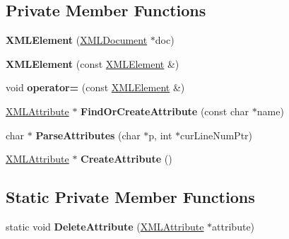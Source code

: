 \subsection*{Private Member Functions}
\begin{DoxyCompactItemize}
\item 
{\bfseries X\+M\+L\+Element} (\hyperlink{classtinyxml2_1_1XMLDocument}{X\+M\+L\+Document} $\ast$doc)\hypertarget{classtinyxml2_1_1XMLElement_a52484940e20f3734e6edc5e5c3af2dbc}{}\label{classtinyxml2_1_1XMLElement_a52484940e20f3734e6edc5e5c3af2dbc}

\item 
{\bfseries X\+M\+L\+Element} (const \hyperlink{classtinyxml2_1_1XMLElement}{X\+M\+L\+Element} \&)\hypertarget{classtinyxml2_1_1XMLElement_a1aa8ab977a1799bf118efb158248351b}{}\label{classtinyxml2_1_1XMLElement_a1aa8ab977a1799bf118efb158248351b}

\item 
void {\bfseries operator=} (const \hyperlink{classtinyxml2_1_1XMLElement}{X\+M\+L\+Element} \&)\hypertarget{classtinyxml2_1_1XMLElement_ae300366701a54d4b6d1c287d9b5209a7}{}\label{classtinyxml2_1_1XMLElement_ae300366701a54d4b6d1c287d9b5209a7}

\item 
\hyperlink{classtinyxml2_1_1XMLAttribute}{X\+M\+L\+Attribute} $\ast$ {\bfseries Find\+Or\+Create\+Attribute} (const char $\ast$name)\hypertarget{classtinyxml2_1_1XMLElement_ac9d8fc849ec8acf46678217de011e896}{}\label{classtinyxml2_1_1XMLElement_ac9d8fc849ec8acf46678217de011e896}

\item 
char $\ast$ {\bfseries Parse\+Attributes} (char $\ast$p, int $\ast$cur\+Line\+Num\+Ptr)\hypertarget{classtinyxml2_1_1XMLElement_a1e679b60e191ad79bfcefcd49ca66fa2}{}\label{classtinyxml2_1_1XMLElement_a1e679b60e191ad79bfcefcd49ca66fa2}

\item 
\hyperlink{classtinyxml2_1_1XMLAttribute}{X\+M\+L\+Attribute} $\ast$ {\bfseries Create\+Attribute} ()\hypertarget{classtinyxml2_1_1XMLElement_a10e25b09c308a8658d2d6b464745bdc3}{}\label{classtinyxml2_1_1XMLElement_a10e25b09c308a8658d2d6b464745bdc3}

\end{DoxyCompactItemize}
\subsection*{Static Private Member Functions}
\begin{DoxyCompactItemize}
\item 
static void {\bfseries Delete\+Attribute} (\hyperlink{classtinyxml2_1_1XMLAttribute}{X\+M\+L\+Attribute} $\ast$attribute)\hypertarget{classtinyxml2_1_1XMLElement_afaab6a1f32caed4d37e6d7f130d277ac}{}\label{classtinyxml2_1_1XMLElement_afaab6a1f32caed4d37e6d7f130d277ac}

\end{DoxyCompactItemize}
